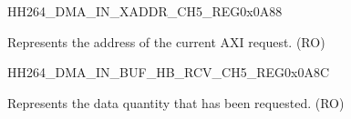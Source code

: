     
    \begin{register}{H}{H264\_DMA\_IN\_XADDR\_CH5\_REG}{0x0A88}\label{regdesc:H264DMAINXADDRCH5REG}
    \regnewline%
    \begin{regdesc}\begin{reglist}
    \label{fielddesc:H264DMAINCMDFIFOXADDRCH5}\item [H264\_DMA\_IN\_CMDFIFO\_XADDR\_CH5] Represents the address of the current AXI request. (RO)
    \end{reglist}\end{regdesc}
    \end{register}
    
    
    \begin{register}{H}{H264\_DMA\_IN\_BUF\_HB\_RCV\_CH5\_REG}{0x0A8C}\label{regdesc:H264DMAINBUFHBRCVCH5REG}
    \regnewline%
    \begin{regdesc}\begin{reglist}
    \label{fielddesc:H264DMAINCMDFIFOBUFHBRCVCH5}\item [H264\_DMA\_IN\_CMDFIFO\_BUF\_HB\_RCV\_CH5] Represents the data quantity that has been requested. (RO)
    \end{reglist}\end{regdesc}
    \end{register}
    
    
    
